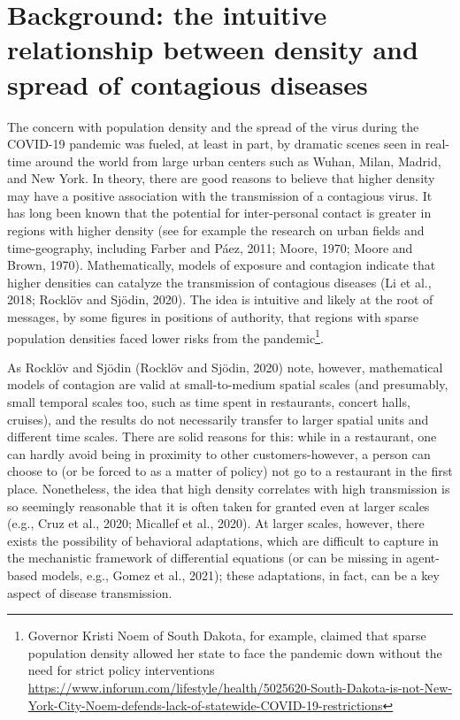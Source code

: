 \documentclass[]{elsarticle} %
\begin{document}
\hypertarget{background-the-intuitive-relationship-between-density-and-spread-of-contagious-diseases}{%
\section{Background: the intuitive relationship between density and
spread of contagious
diseases}\label{background-the-intuitive-relationship-between-density-and-spread-of-contagious-diseases}}

The concern with population density and the spread of the virus during
the COVID-19 pandemic was fueled, at least in part, by dramatic scenes
seen in real-time around the world from large urban centers such as
Wuhan, Milan, Madrid, and New York. In theory, there are good reasons to
believe that higher density may have a positive association with the
transmission of a contagious virus. It has long been known that the
potential for inter-personal contact is greater in regions with higher
density (see for example the research on urban fields and
time-geography, including Farber and Páez, 2011; Moore, 1970; Moore and
Brown, 1970). Mathematically, models of exposure and contagion indicate
that higher densities can catalyze the transmission of contagious
diseases (Li et al., 2018; Rocklöv and Sjödin, 2020). The idea is
intuitive and likely at the root of messages, by some figures in
positions of authority, that regions with sparse population densities
faced lower risks from the pandemic\footnote{Governor Kristi Noem of
  South Dakota, for example, claimed that sparse population density
  allowed her state to face the pandemic down without the need for
  strict policy interventions
  \url{https://www.inforum.com/lifestyle/health/5025620-South-Dakota-is-not-New-York-City-Noem-defends-lack-of-statewide-COVID-19-restrictions}}.

As Rocklöv and Sjödin (Rocklöv and Sjödin, 2020) note, however,
mathematical models of contagion are valid at small-to-medium spatial
scales (and presumably, small temporal scales too, such as time spent in
restaurants, concert halls, cruises), and the results do not necessarily
transfer to larger spatial units and different time scales. There are
solid reasons for this: while in a restaurant, one can hardly avoid
being in proximity to other customers-however, a person can choose to
(or be forced to as a matter of policy) not go to a restaurant in the
first place. Nonetheless, the idea that high density correlates with
high transmission is so seemingly reasonable that it is often taken for
granted even at larger scales (e.g., Cruz et al., 2020; Micallef et al.,
2020). At larger scales, however, there exists the possibility of
behavioral adaptations, which are difficult to capture in the
mechanistic framework of differential equations (or can be missing in
agent-based models, e.g., Gomez et al., 2021); these adaptations, in
fact, can be a key aspect of disease transmission.
\end{document}
